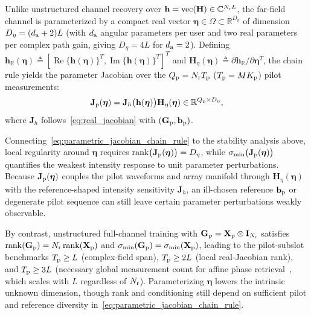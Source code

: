 \documentclass[journal]{IEEEtran}
\begin{document}
Unlike unstructured channel recovery over $\mathbf{h} = \operatorname{vec}(\mathbf{H}) \in \mathbb{C}^{N_{\rm r}L}$, the far-field channel is parameterized by a compact real vector $\boldsymbol{\eta} \in \Omega \subset \mathbb{R}^{D_{\eta}}$ of dimension $D_{\eta} = (d_{\rm a}+2)L$ (with $d_{\rm a}$ angular parameters per user and two real parameters per complex path gain, giving $D_{\eta} = 4L$ for $d_{\rm a}=2$). Defining $\mathbf{h}_{\mathbb{R}}(\boldsymbol{\eta}) \triangleq [\operatorname{Re}\{\mathbf{h}(\boldsymbol{\eta})\}^{T}, \operatorname{Im}\{\mathbf{h}(\boldsymbol{\eta})\}^{T}]^{T}$ and $\mathbf{H}_{\eta}(\boldsymbol{\eta}) \triangleq \partial\mathbf{h}_{\mathbb{R}}/\partial\boldsymbol{\eta}^{T}$, the chain rule yields the parameter Jacobian over the $Q_{\rm p} = N_{\rm r}T_{\rm p}$ ($T_{\rm p} = MK_{\rm p}$) pilot measurements:
\begin{equation}
\mathbf{J}_{\rm p}(\boldsymbol{\eta})
=
\mathbf{J}_{h}\bigl(\mathbf{h}(\boldsymbol{\eta})\bigr)\mathbf{H}_{\eta}(\boldsymbol{\eta})
\in \mathbb{R}^{Q_{\rm p}\times D_{\eta}},
\label{eq:parametric_jacobian_chain_rule}
\end{equation}
where $\mathbf{J}_{h}$ follows~\eqref{eq:real_jacobian} with $(\mathbf{G}_{\rm p}, \mathbf{b}_{\rm p})$.

Connecting~\eqref{eq:parametric_jacobian_chain_rule} to the stability analysis above, local regularity around $\boldsymbol{\eta}$ requires $\operatorname{rank}\bigl(\mathbf{J}_{\rm p}(\boldsymbol{\eta})\bigr) = D_{\eta}$, while $\sigma_{\min}\bigl(\mathbf{J}_{\rm p}(\boldsymbol{\eta})\bigr)$ quantifies the weakest intensity response to unit parameter perturbations. Because $\mathbf{J}_{\rm p}(\boldsymbol{\eta})$ couples the pilot waveforms and array manifold through $\mathbf{H}_{\eta}(\boldsymbol{\eta})$ with the reference-shaped intensity sensitivity $\mathbf{J}_{h}$, an ill-chosen reference $\mathbf{b}_{\rm p}$ or degenerate pilot sequence can still leave certain parameter perturbations weakly observable.

By contrast, unstructured full-channel training with $\mathbf{G}_{\rm p} = \mathbf{X}_{\rm p} \otimes \mathbf{I}_{N_{\rm r}}$ satisfies $\operatorname{rank}(\mathbf{G}_{\rm p}) = N_{\rm r}\operatorname{rank}(\mathbf{X}_{\rm p})$ and $\sigma_{\min}(\mathbf{G}_{\rm p}) = \sigma_{\min}(\mathbf{X}_{\rm p})$, leading to the pilot-subslot benchmarks $T_{\rm p} \ge L$ (complex-field span), $T_{\rm p} \ge 2L$ (local real-Jacobian rank), and $T_{\rm p} \ge 3L$ (necessary global measurement count for affine phase retrieval~\cite{affine_phase_retrieval}, which scales with $L$ regardless of $N_{\rm r}$). Parameterizing $\boldsymbol{\eta}$ lowers the intrinsic unknown dimension, though rank and conditioning still depend on sufficient pilot and reference diversity in~\eqref{eq:parametric_jacobian_chain_rule}.
\end{document}

